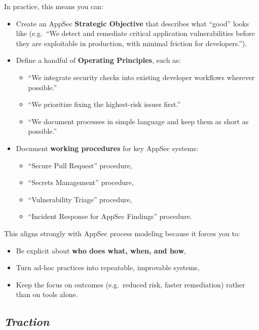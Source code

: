 \documentclass[11pt]{article}
\begin{document}
In practice, this means you can:
\begin{itemize}
  \item Create an AppSec \textbf{Strategic Objective} that describes
        what ``good'' looks like (e.g.\ ``We detect and remediate
        critical application vulnerabilities before they are exploitable
        in production, with minimal friction for developers.'').
  \item Define a handful of \textbf{Operating Principles}, such as:
        \begin{itemize}
          \item ``We integrate security checks into existing developer
                workflows wherever possible.''
          \item ``We prioritize fixing the highest-risk issues first.''
          \item ``We document processes in simple language and keep them
                as short as possible.''
        \end{itemize}
  \item Document \textbf{working procedures} for key AppSec systems:
        \begin{itemize}
          \item ``Secure Pull Request'' procedure,
          \item ``Secrets Management'' procedure,
          \item ``Vulnerability Triage'' procedure,
          \item ``Incident Response for AppSec Findings'' procedure.
        \end{itemize}
\end{itemize}

This aligns strongly with AppSec process modeling because it forces you to:

\begin{itemize}
  \item Be explicit about \textbf{who does what, when, and how},
  \item Turn ad-hoc practices into repeatable, improvable systems,
  \item Keep the focus on outcomes (e.g.\ reduced risk, faster remediation)
        rather than on tools alone.
\end{itemize}

\subsection{\emph{Traction}}
\end{document}
